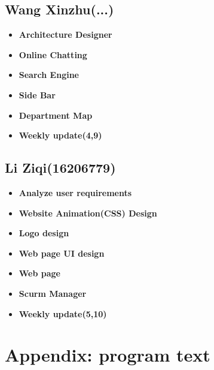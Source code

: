 \documentclass[a4paper]{article}
\begin{document}
\subsection{Wang Xinzhu(...)}
\begin{itemize}
    \item \textbf{Architecture Designer}
    \item \textbf{Online Chatting}
    \item \textbf{Search Engine}
    \item \textbf{Side Bar}
    \item \textbf{Department Map}
    \item \textbf{Weekly update(4,9)}
\end{itemize}
\subsection{Li Ziqi(16206779)}
\begin{itemize}
    \item \textbf{Analyze user requirements}  \newline
    \item \textbf{Website Animation(CSS) Design}
    \item \textbf{Logo design}
    \item \textbf{Web page UI design}
    \item \textbf{Web page}
    \item \textbf{Scurm Manager}
    \item \textbf{Weekly update(5,10)}

\end{itemize}
\section{Appendix: program text}




%

%
\end{document}
